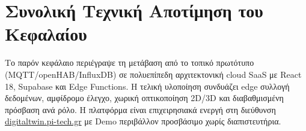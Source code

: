\section{Συνολική Τεχνική Αποτίμηση του Κεφαλαίου}
Το παρόν κεφάλαιο περιέγραψε τη μετάβαση από το τοπικό πρωτότυπο (\textlatin{MQTT/openHAB/InfluxDB}) σε πολυεπίπεδη αρχιτεκτονική \textlatin{cloud SaaS} με \textlatin{React 18}, \textlatin{Supabase} και \textlatin{Edge Functions}. Η τελική υλοποίηση συνδυάζει \textlatin{edge} συλλογή δεδομένων, αμφίδρομο έλεγχο, χωρική οπτικοποίηση \textlatin{2D/3D} και διαβαθμισμένη πρόσβαση ανά ρόλο. Η πλατφόρμα είναι επιχειρησιακά ενεργή στη διεύθυνση \href{https://digitaltwin.pi-tech.gr}{\textlatin{digitaltwin.pi-tech.gr}} με \textlatin{Demo} περιβάλλον προσβάσιμο χωρίς διαπιστευτήρια.

